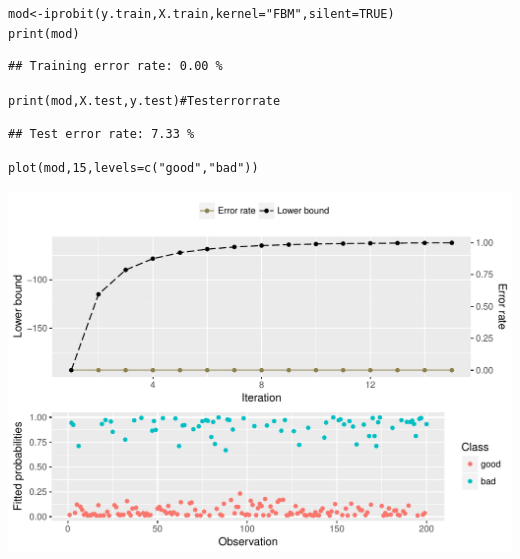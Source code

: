 \documentclass[class=article, crop=false]{standalone}\usepackage[]{graphicx}\usepackage[]{color}
\makeatletter
\def\maxwidth{ %
  \ifdim\Gin@nat@width>\linewidth
    \linewidth
  \else
    \Gin@nat@width
  \fi
}
\newcommand{\hlnum}[1]{\textcolor[rgb]{0.063,0.58,0.627}{#1}}%
\newcommand{\hlstr}[1]{\textcolor[rgb]{0.063,0.58,0.627}{#1}}%
\newcommand{\hlcom}[1]{\textcolor[rgb]{0.588,0.588,0.588}{#1}}%
\newcommand{\hlstd}[1]{\textcolor[rgb]{0.196,0.196,0.196}{#1}}%
\newcommand{\hlkwb}[1]{\textcolor[rgb]{0.627,0,0.314}{#1}}%
\newcommand{\hlkwc}[1]{\textcolor[rgb]{0,0.631,0.314}{#1}}%
\newcommand{\hlkwd}[1]{\textcolor[rgb]{0.78,0.227,0.412}{#1}}%
\newenvironment{kframe}{%
 \def\at@end@of@kframe{}%
 \ifinner\ifhmode%
  \def\at@end@of@kframe{\end{minipage}}%
  \begin{minipage}{\columnwidth}%
 \fi\fi%
 \def\FrameCommand##1{\hskip\@totalleftmargin \hskip-\fboxsep
 \colorbox{shadecolor}{##1}\hskip-\fboxsep
     \hskip-\linewidth \hskip-\@totalleftmargin \hskip\columnwidth}%
 \MakeFramed {\advance\hsize-\width
   \@totalleftmargin\z@ \linewidth\hsize
   \@setminipage}}%
 {\par\unskip\endMakeFramed%
 \at@end@of@kframe}
\newenvironment{knitrout}{}{} %
\makeatother
\begin{document}
\begin{knitrout}
\color{fgcolor}\begin{kframe}
\begin{alltt}
\hlstd{mod} \hlkwb{<-} \hlkwd{iprobit}\hlstd{(y.train, X.train,} \hlkwc{kernel} \hlstd{=} \hlstr{"FBM"}\hlstd{,} \hlkwc{silent} \hlstd{=} \hlnum{TRUE}\hlstd{)}
\hlkwd{print}\hlstd{(mod)}
\end{alltt}
\begin{verbatim}
## Training error rate: 0.00 %
\end{verbatim}
\begin{alltt}
\hlkwd{print}\hlstd{(mod, X.test, y.test)}  \hlcom{# Test error rate}
\end{alltt}
\begin{verbatim}
## Test error rate: 7.33 %
\end{verbatim}
\end{kframe}
\end{knitrout}
\begin{knitrout}
\color{fgcolor}\begin{kframe}
\begin{alltt}
\hlkwd{plot}\hlstd{(mod,} \hlnum{15}\hlstd{,} \hlkwc{levels} \hlstd{=} \hlkwd{c}\hlstd{(}\hlstr{"good"}\hlstd{,} \hlstr{"bad"}\hlstd{))}
\end{alltt}
\end{kframe}

{\centering \includegraphics[width=\maxwidth]{figure/ionosphere_plot-1} 

}



\end{knitrout}
\end{document}
